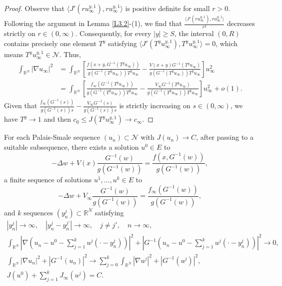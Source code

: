 \documentclass[reqno]{amsart}
\begin{document}
\begin{proof}
Observe that $\langle J'(ru_{\infty}^{y,1}),ru_{\infty}^{y,1}\rangle$ is positive definite for 
small $r>0$. Following the argument in Lemma \ref{L3.2}-(1), we find that 
$\frac{\langle J'(ru_{\infty}^{y,1}),ru_{\infty}^{y,1}\rangle}{r^{2}}$ decreases strictly on 
$r\in(0,\infty)$.
Consequently, for every $|y|\geq S$, the interval $(0, R)$ contains precisely one element 
$T^y$ satisfying   $\langle J'(T^yu_{\infty}^{y,1}),T^yu_{\infty}^{y,1}\rangle=0$, which means 
$T^y u_{\infty}^{y,1}\in\mathcal{N}$. Thus,
\begin{align*}
\int_{\mathbb{R}^{N}} \vert \nabla u_{\infty} \vert^{2} 
&= \int_{\mathbb{R}^{N}} [\frac{f(x+y,G^{-1}(T^{y}u_{\infty}))}{g(G^{-1}(T^{y}u_{\infty}))
 T^{y}u_{\infty}} - \frac{V(x + y)G^{-1}(T^{y}u_{\infty})}{g(G^{-1}(T^{y}u_{\infty}))T^{y}u_{\infty}}]u_{\infty}^{2} \\
&= \int_{\mathbb{R}^{N}} [\frac{f_\infty(G^{-1}(T^{y}u_{\infty}))}{g(G^{-1}(T^{y}u_{\infty}))T^{y}u_{\infty}} - \frac{V_\infty G^{-1}(T^{y}u_{\infty})}{g(G^{-1}(T^{y}u_{\infty}))T^{y}
u_{\infty}}]u_{\infty}^{2} + o(1).
\end{align*} 
Given that $\frac{f_\infty(G^{-1}(s))}{g(G^{-1}(s))s} -\frac{V_\infty G^{-1}(s)}{g(G^{-1}(s))s}$  
is strictly increasing on $s\in(0,\infty)$, we have $T^y\to1$ and then 
$c_0\leq J(T^y u_{\infty}^{y,1})\to c_\infty$.
\end{proof}

\begin{lemma}\label{L3.12}
For each Palais-Smale sequence  $(u_n) \subset \mathcal{N}$ with $J(u_n)\to C$, 
after passing to a suitable subsequence, there exists a solution $u^0 \in E$ to
\[
-\Delta w + V(x)\frac{G^{-1}(w)}{g(G^{-1}(w))}= \frac{f(x,G^{-1}(w))}{g(G^{-1}(w))},
\]
 a finite sequence of solutions $u^1, \ldots, u^k \in E$ to
\[
-\Delta w + V_\infty \frac{G^{-1}(w)}{g(G^{-1}(w))} = \frac{f_\infty(G^{-1}(w))}{g(G^{-1}(w))},
\]
and $k$ sequences $(y_n^j) \subset \mathbb{R}^N$ satisfying
\begin{gather*}
|y_n^j| \to \infty, \quad |y_n^j - y_n^{j'}| \to \infty, \quad j \neq j', \quad n \to \infty, \\
\int_{\mathbb{R}^N} |\nabla (u_n - u^0 - \sum_{j=1}^k u^j(\cdot - y_n^j))|^2 + |G^{-1}(u_n - u^0 - \sum_{j=1}^k u^j(\cdot - y_n^j))|^2\to 0, \\
\int_{\mathbb{R}^N} |\nabla u_n|^2 + |G^{-1}(u_n) |^2
\to \sum_{j=0}^k \int_{\mathbb{R}^N} |\nabla u^j|^2 + |G^{-1}(u^j)|^2, \\
J(u^0) + \sum_{j=1}^k J_\infty (u^j) = C.
\end{gather*}
\end{lemma}
\end{document}
